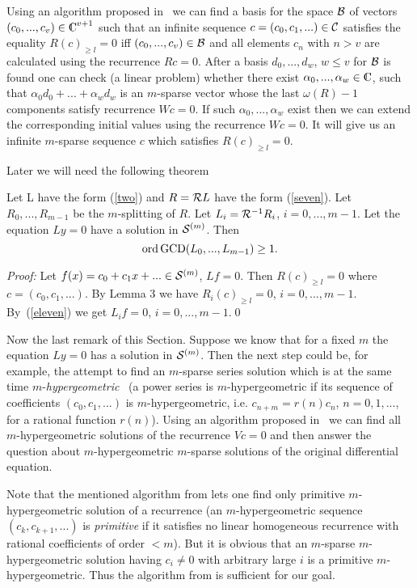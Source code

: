 Using an algorithm proposed in~\cite{ABP} we can find a basis for the
space ${\cal B}$ of vectors $(c_0,...,c_v)\in \complex^{v+1}$ such that
an infinite sequence $c=(c_0,c_1,...)\in {\cal C}$ satisfies the equality
$R(c)_{\geq l}=0$ iff $(c_0,...,c_v)\in {\cal B}$
and all elements $c_n$ with $n>v$ are calculated using the recurrence
$Rc=0$. After a basis $d_0,...,d_w$, $w\le v$ for ${\cal B}$ is found
one can check (a linear problem) whether there exist
$\alpha_0,...,\alpha_w \in \complex$, such that $\alpha_0d_0+...+\alpha_w d_w$
is an $m$-sparse vector whose the last $\omega (R)-1$ components
satisfy recurrence $Wc=0$. If such $\alpha_0,...,\alpha_w$
exist then we can extend the corresponding initial values using the
recurrence $Wc=0$. It will give us an infinite
$m$-sparse sequence $c$ which satisfies $R(c)_{\geq l}=0$.

Later we will need the following theorem
\begin{Theorem}
Let L have the form (\ref{two}) and $R={\cal R} L$ have the form
(\ref{seven}).
Let $R_0,...,R_{m-1}$ be the $m$-splitting of $R$. Let
$L_i={\cal R}^{-1}R_i$, $i=0,...,m-1$.
Let the equation $Ly=0$ have a solution
in ${\cal S}^{(m)}$. Then
\begin{equation}
\label{15}
\mathop{\rm ord} \mathop{\rm GCD}(L_0,...,L_{m-1}) \ge 1.
\end{equation}
\end{Theorem}
{\em Proof:\/}
Let $f(x)=c_0+c_1x+... \in {\cal S}^{(m)}$, $Lf=0$. Then
$R(c)_{\geq l}=0$ where $c=(c_0,c_1,...)$. By Lemma 3 we have
$R_i(c)_{\geq l}=0$, $i=0,...,m-1$.  By~(\ref{eleven}) we get
$L_if=0$, $i=0,...,m-1$.\qed


Now the last remark of this Section. Suppose we know that
for a fixed $m$ the equation $Ly=0$
has a solution in ${\cal S}^{(m)}$. Then the next step could be,
for example, the attempt to find an $m$-sparse series solution which is
at the same time $m$-{\em hypergeometric}~\cite{PS}
(a power series is $m$-hypergeometric if
its sequence of coefficients $(c_0,c_1,...)$ is $m$-hypergeometric, i.e.
$c_{n+m}=r(n)c_n$, $n=0,1,...$, for a rational function $r(n)$).
Using an algorithm proposed in~\cite{PS} we can find all $m$-hypergeometric
solutions of the recurrence $Vc=0$ and then answer the question about
$m$-hypergeometric $m$-sparse solutions of the original differential
equation.

Note that the mentioned algorithm from \cite{PS} lets one
find only primitive $m$-hy\-per\-ge\-omet\-ric solution of a
recurrence (an $m$-hypergeometric sequence $(c_k,c_{k+1},...)$ is
{\em primitive} if it satisfies no linear homogeneous recurrence with
rational coefficients of order $<m$). But it is obvious that an
$m$-sparse $m$-hypergeometric solution having $c_i\neq 0$ with
arbitrary large $i$ is a primitive $m$-hypergeometric. Thus the
algorithm from \cite{PS} is sufficient for our goal.

